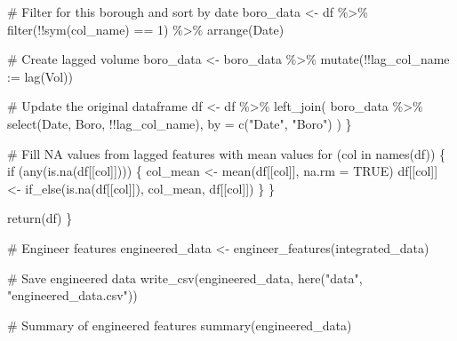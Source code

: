 \documentclass[
  letterpaper,
  DIV=11,
  numbers=noendperiod]{scrreprt}
\newenvironment{Shaded}{\begin{snugshade}}{\end{snugshade}}
\newcommand{\AttributeTok}[1]{\textcolor[rgb]{0.40,0.45,0.13}{#1}}
\newcommand{\CommentTok}[1]{\textcolor[rgb]{0.37,0.37,0.37}{#1}}
\newcommand{\ConstantTok}[1]{\textcolor[rgb]{0.56,0.35,0.01}{#1}}
\newcommand{\ControlFlowTok}[1]{\textcolor[rgb]{0.00,0.23,0.31}{#1}}
\newcommand{\DecValTok}[1]{\textcolor[rgb]{0.68,0.00,0.00}{#1}}
\newcommand{\FunctionTok}[1]{\textcolor[rgb]{0.28,0.35,0.67}{#1}}
\newcommand{\NormalTok}[1]{\textcolor[rgb]{0.00,0.23,0.31}{#1}}
\newcommand{\OtherTok}[1]{\textcolor[rgb]{0.00,0.23,0.31}{#1}}
\newcommand{\SpecialCharTok}[1]{\textcolor[rgb]{0.37,0.37,0.37}{#1}}
\newcommand{\StringTok}[1]{\textcolor[rgb]{0.13,0.47,0.30}{#1}}
\begin{document}
\begin{Shaded}
\begin{Highlighting}[]
    \CommentTok{\# Filter for this borough and sort by date}
\NormalTok{    boro\_data }\OtherTok{\textless{}{-}}\NormalTok{ df }\SpecialCharTok{\%\textgreater{}\%}
      \FunctionTok{filter}\NormalTok{(}\SpecialCharTok{!!}\FunctionTok{sym}\NormalTok{(col\_name) }\SpecialCharTok{==} \DecValTok{1}\NormalTok{) }\SpecialCharTok{\%\textgreater{}\%}
      \FunctionTok{arrange}\NormalTok{(Date)}
    
    \CommentTok{\# Create lagged volume}
\NormalTok{    boro\_data }\OtherTok{\textless{}{-}}\NormalTok{ boro\_data }\SpecialCharTok{\%\textgreater{}\%}
      \FunctionTok{mutate}\NormalTok{(}\SpecialCharTok{!!}\AttributeTok{lag\_col\_name :=} \FunctionTok{lag}\NormalTok{(Vol))}
    
    \CommentTok{\# Update the original dataframe}
\NormalTok{    df }\OtherTok{\textless{}{-}}\NormalTok{ df }\SpecialCharTok{\%\textgreater{}\%}
      \FunctionTok{left\_join}\NormalTok{(}
\NormalTok{        boro\_data }\SpecialCharTok{\%\textgreater{}\%} \FunctionTok{select}\NormalTok{(Date, Boro, }\SpecialCharTok{!!}\NormalTok{lag\_col\_name),}
        \AttributeTok{by =} \FunctionTok{c}\NormalTok{(}\StringTok{"Date"}\NormalTok{, }\StringTok{"Boro"}\NormalTok{)}
\NormalTok{      )}
\NormalTok{  \}}
  
  \CommentTok{\# Fill NA values from lagged features with mean values}
  \ControlFlowTok{for}\NormalTok{ (col }\ControlFlowTok{in} \FunctionTok{names}\NormalTok{(df)) \{}
    \ControlFlowTok{if}\NormalTok{ (}\FunctionTok{any}\NormalTok{(}\FunctionTok{is.na}\NormalTok{(df[[col]]))) \{}
\NormalTok{      col\_mean }\OtherTok{\textless{}{-}} \FunctionTok{mean}\NormalTok{(df[[col]], }\AttributeTok{na.rm =} \ConstantTok{TRUE}\NormalTok{)}
\NormalTok{      df[[col]] }\OtherTok{\textless{}{-}} \FunctionTok{if\_else}\NormalTok{(}\FunctionTok{is.na}\NormalTok{(df[[col]]), col\_mean, df[[col]])}
\NormalTok{    \}}
\NormalTok{  \}}
  
  \FunctionTok{return}\NormalTok{(df)}
\NormalTok{\}}

\CommentTok{\# Engineer features}
\NormalTok{engineered\_data }\OtherTok{\textless{}{-}} \FunctionTok{engineer\_features}\NormalTok{(integrated\_data)}

\CommentTok{\# Save engineered data}
\FunctionTok{write\_csv}\NormalTok{(engineered\_data, }\FunctionTok{here}\NormalTok{(}\StringTok{"data"}\NormalTok{, }\StringTok{"engineered\_data.csv"}\NormalTok{))}

\CommentTok{\# Summary of engineered features}
\FunctionTok{summary}\NormalTok{(engineered\_data)}
\end{Highlighting}
\end{Shaded}
\end{document}

